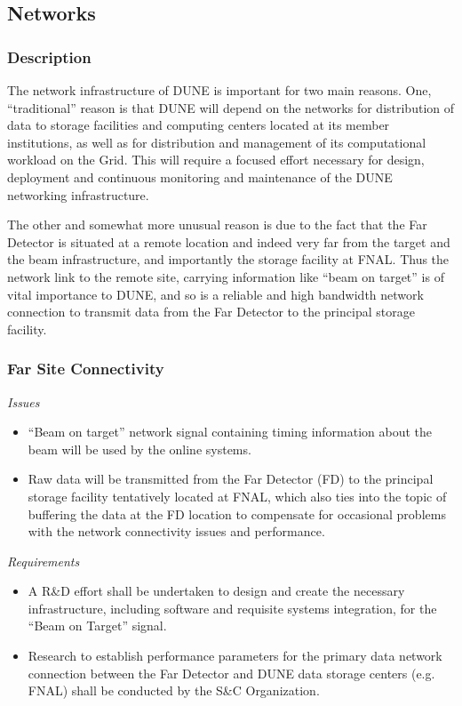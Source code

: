 \subsection{Networks}

\subsubsection{Description}
The network infrastructure of DUNE is important for two main reasons. One, “traditional” reason is that DUNE will depend on the networks for distribution of  data to storage facilities and computing centers located at its member institutions, as well as for distribution and management of its computational workload on the Grid. This will require a focused effort necessary for design, deployment and continuous monitoring and maintenance of the DUNE networking infrastructure.

The other and somewhat more unusual reason  is due to the fact that the Far Detector is situated at a remote location and indeed very far from the target and the beam infrastructure,  and importantly the storage facility at FNAL. Thus the network link to the remote site, carrying information like ``beam on target'' is of vital importance to DUNE, and so is a reliable and high bandwidth network connection to transmit data from the Far Detector to the principal storage facility.

\subsubsection{Far Site Connectivity}
\textit{Issues}

\begin{itemize}
	
	\item ``Beam on target'' network signal containing timing information about the beam will be used by the online systems.
	
	\item Raw data will be transmitted from the Far Detector (FD) to the principal storage facility tentatively located at FNAL, which also ties into the topic of buffering the data at the FD location to compensate for occasional problems with the network connectivity issues and performance.
	
\end{itemize}
\noindent
\textit{Requirements}
\begin{itemize}
	\item A R\&D effort shall be undertaken to design and create the necessary infrastructure, including software and requisite systems integration, 
	for the ``Beam on Target'' signal.
	
	\item Research to establish performance parameters for the primary data network connection between the Far Detector and  DUNE data storage centers (e.g. FNAL) shall be conducted by the S\&C Organization.
	
\end{itemize}

